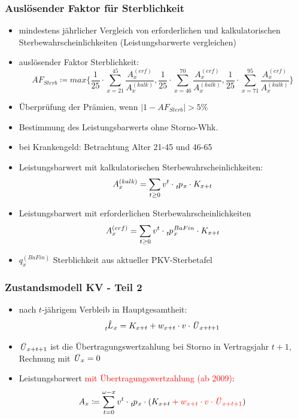 \documentclass[12pt]{report}
\theoremstyle{dotless}
\theoremstyle{definition}
\begin{document}
\subsubsection{Auslösender Faktor für Sterblichkeit}
\begin{itemize}
	\item mindestens jährlicher Vergleich von erforderlichen und kalkulatorischen Sterbewahrscheinlichkeiten (Leistungsbarwerte vergleichen)
	\item auslösender Faktor Sterblichkeit:
		\begin{equation}
			AF_{Sterb} \coloneqq max\biggl\{\frac{1}{25} \cdot \sum_{x=21}^{45} \frac{A_x^{(erf)}}{A_x^{(kalk)}}, \frac{1}{25} \cdot \sum_{x=46}^{70} \frac{A_x^{(erf)}}{A_x^{(kalk)}}, \frac{1}{25} \cdot \sum_{x=71}^{95} \frac{A_x^{(erf)}}{A_x^{(kalk)}}\biggr\}
		\end{equation}
	\item Überprüfung der Prämien, wenn $|1-AF_{Sterb}|>5\%$
	\item Bestimmung des Leistungsbarwerts ohne Storno-Whk.
	\item bei Krankengeld: Betrachtung Alter 21-45 und 46-65
	\item Leistungsbarwert mit kalkulatorischen Sterbewahrscheinlichkeiten:
		\begin{equation}
			A_x^{(kalk)}=\sum_{t\geq 0} v^t \cdot \tensor[_t]{p}{}_x \cdot K_{x+t}
		\end{equation}
	\item Leistungsbarwert mit erforderlichen Sterbewahrscheinlichkeiten
		\begin{equation}
			A_x^{(erf)}=\sum_{t\geq 0} v^t \cdot \tensor[_t]{p}{}_x^{BaFin} \cdot K_{x+t}
		\end{equation}
	\item $q_x^{(BaFin)}$ Sterblichkeit aus aktueller PKV-Sterbetafel
\end{itemize}

\subsubsection{Zustandsmodell KV - Teil 2}
\begin{itemize}
	\item nach $t$-jährigem Verbleib in Hauptgesamtheit: 
		\begin{equation}
			\tensor[_t]{\hat{L}}{}_x = K_{x+t}+w_{x+t} \cdot v \cdot \text{\textit{Ü}}_{x+t+1}
		\end{equation}
	\item $\text{\textit{Ü}}_{x+t+1}$ ist die Übertragungswertzahlung bei Storno in Vertragsjahr $t+1$, Rechnung mit $\text{\textit{Ü}}_{x}=0$
	\item Leistungsbarwert \textcolor{red}{mit Übertragungswertzahlung (ab 2009)}:
		\begin{align}
			A_x \coloneqq \sum_{t=0}^{\omega-x} v^t \cdot \tensor[_t]{p}{}_x \cdot (K_{x+t} \color{red} + w_{x+t}\cdot v \cdot \text{\textit{Ü}}_{x+t+1} \color{black})
		\end{align}
\end{itemize}
\end{document}
